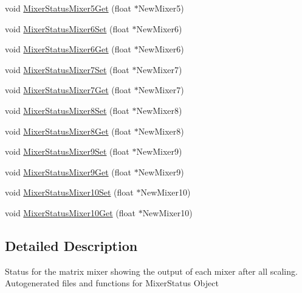 \begin{DoxyCompactItemize}
void \hyperlink{group___mixer_status_gae278cf9d277824736bcd1312ee614718}{\-Mixer\-Status\-Mixer5\-Get} (float $\ast$\-New\-Mixer5)
\item 
void \hyperlink{group___mixer_status_ga41532491bbd09f58bfe93e64cb197310}{\-Mixer\-Status\-Mixer6\-Set} (float $\ast$\-New\-Mixer6)
\item 
void \hyperlink{group___mixer_status_gab0ab668940766bf566e2a2e18864b23e}{\-Mixer\-Status\-Mixer6\-Get} (float $\ast$\-New\-Mixer6)
\item 
void \hyperlink{group___mixer_status_ga8836d16c671b320e517fe23c2dd74acb}{\-Mixer\-Status\-Mixer7\-Set} (float $\ast$\-New\-Mixer7)
\item 
void \hyperlink{group___mixer_status_ga2dad804b38fe5213bfb06cdeba6beaa3}{\-Mixer\-Status\-Mixer7\-Get} (float $\ast$\-New\-Mixer7)
\item 
void \hyperlink{group___mixer_status_ga8227c062098d3aca72bd8c736d6d2a85}{\-Mixer\-Status\-Mixer8\-Set} (float $\ast$\-New\-Mixer8)
\item 
void \hyperlink{group___mixer_status_gaf608e2ce7710780f2dffcad225cd00ff}{\-Mixer\-Status\-Mixer8\-Get} (float $\ast$\-New\-Mixer8)
\item 
void \hyperlink{group___mixer_status_ga1dce0355e5fdaecb86f9abf3ecfaf51f}{\-Mixer\-Status\-Mixer9\-Set} (float $\ast$\-New\-Mixer9)
\item 
void \hyperlink{group___mixer_status_ga87b5412770923b65916db70824c514d3}{\-Mixer\-Status\-Mixer9\-Get} (float $\ast$\-New\-Mixer9)
\item 
void \hyperlink{group___mixer_status_gabcc865d44c0d5369eccc85e56175f88e}{\-Mixer\-Status\-Mixer10\-Set} (float $\ast$\-New\-Mixer10)
\item 
void \hyperlink{group___mixer_status_ga4eb92508b09aee8302d59a4318ba33da}{\-Mixer\-Status\-Mixer10\-Get} (float $\ast$\-New\-Mixer10)
\end{DoxyCompactItemize}


\subsection{\-Detailed \-Description}
\-Status for the matrix mixer showing the output of each mixer after all scaling. \-Autogenerated files and functions for \-Mixer\-Status \-Object 

